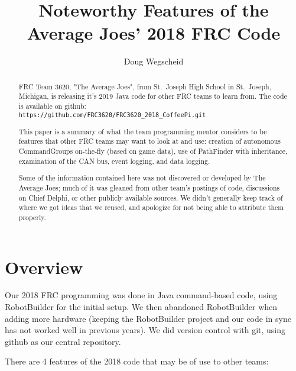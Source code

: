 \documentclass[]{article}
\title{Noteworthy Features of the Average Joes' 2018 FRC Code}
\author{Doug Wegscheid}
\begin{document}
\maketitle

\begin{abstract}

FRC Team 3620, "The Average Joes", from St.\ Joseph High School in St.\ Joseph, Michigan, is releasing it's 2019 Java code for other FRC teams to learn from.
The code is available on github:
\\
\texttt{https://github.com/FRC3620/FRC3620\_2018\_CoffeePi.git}

This paper is a summary of what the team programming mentor considers to be features that other FRC teams may want to look at and use: creation of autonomous CommandGroups on-the-fly (based on game data), use of PathFinder with inheritance, examination of the CAN bus, event logging, and data logging.

Some of the information contained here was not discovered or developed by The Average Joes; much of it was gleaned from other team's postings of code, discussions on Chief Delphi, or other publicly available sources.
We didn't generally keep track of where we got ideas that we reused, and apologize for not being able to attribute them properly.

\end{abstract}

\section{Overview}

Our 2018 FRC programming was done in Java command-based code, using RobotBuilder for the initial setup. We then abandoned RobotBuilder when adding more hardware (keeping the RobotBuilder project and our code in sync has not worked well in previous years).
We did version control with git, using github as our central repository.

There are 4 features of the 2018 code that may be of use to other teams:
\end{document}
